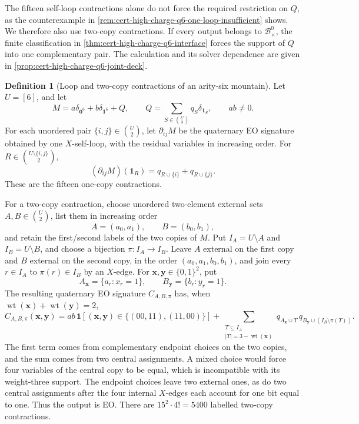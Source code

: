 \documentclass[11pt,letterpaper,onecolumn]{article}
\theoremstyle{plain}
\theoremstyle{definition}
\newtheorem{definition}[definition]{Definition}
\theoremstyle{remark}
\newcommand{\wt}{\operatorname{wt}}
\newcommand{\one}{\mathbf 1}
\newcommand{\zero}{\mathbf 0}
\begin{document}
	The fifteen self-loop contractions alone do not force the required
	restriction on \(Q\), as the counterexample in
	\cref{rem:cert-high-charge-q6-one-loop-insufficient} shows. We therefore
also use two-copy contractions. If every output belongs to
\(\mathcal B_\times^0\), the finite classification in
\cref{thm:cert-high-charge-q6-interface} forces the support of \(Q\) into
one complementary pair. The calculation and its solver dependence are
given in \cref{prop:cert-high-charge-q6-joint-deck}.
	
	\begin{definition}[Loop and two-copy contractions of an arity-six mountain]
		\label{def:hc-q6-joint-deck}
		Let \(U=[6]\), and let
		\[
		M=a\delta_{\zero^6}+b\delta_{\one^6}+Q,
		\qquad
		Q=\sum_{S\in\binom U3}q_S\delta_{\one_S},
		\qquad ab\ne0.
		\]
		For each unordered pair \(\{i,j\}\in\binom U2\), let
		\(\partial_{ij}M\) be the quaternary EO signature obtained by one
		\(X\)-self-loop, with the residual variables in increasing order.  For
		\(R\in\binom{U\setminus\{i,j\}}2\),
		\begin{equation}
			(\partial_{ij}M)(\one_R)=q_{R\cup\{i\}}+q_{R\cup\{j\}}.
			\label{eq:hc-q6-loop-deck}
		\end{equation}
		These are the fifteen one-copy contractions.
		
		For a two-copy contraction, choose unordered two-element external sets
		\(A,B\in\binom U2\), list them in increasing order
		\[
		A=(a_0,a_1),
		\qquad
		B=(b_0,b_1),
		\]
		and retain the first/second labels of the two copies of \(M\).
		Put \(I_A=U\setminus A\) and \(I_B=U\setminus B\), and choose a
		bijection \(\pi:I_A\to I_B\).  Leave \(A\) external on the first copy
		and \(B\) external on the second copy, in the order
		\((a_0,a_1,b_0,b_1)\), and join every \(r\in I_A\) to
		\(\pi(r)\in I_B\) by an \(X\)-edge.  For
		\({\mathbf x},{\mathbf y}\in\{0,1\}^2\), put
		\[
		A_{\mathbf x}=\{a_r:x_r=1\},
		\qquad
		B_{\mathbf y}=\{b_r:y_r=1\}.
		\]
		The resulting quaternary EO signature \(C_{A,B,\pi}\) has, when
		\(\wt({\mathbf x})+\wt({\mathbf y})=2\),
		\begin{equation}
			C_{A,B,\pi}({\mathbf x},{\mathbf y})
			=ab\,\one[({\mathbf x},{\mathbf y})\in\{(00,11),(11,00)\}]
			+\sum_{\substack{T\subseteq I_A\\|T|=3-\wt({\mathbf x})}}
			q_{A_{\mathbf x}\cup T}\,
			q_{B_{\mathbf y}\cup(I_B\setminus\pi(T))}.
			\label{eq:hc-q6-two-copy-deck}
		\end{equation}
		The first term comes from complementary endpoint choices on the two
		copies, and the sum comes from two central assignments. A mixed choice
		would force four variables of the central copy to be equal, which is
		incompatible with its weight-three support. The endpoint choices leave
		two external ones, as do two central assignments after the four internal
		\(X\)-edges each account for one bit equal to one. Thus the output is EO.
		There are \(15^2\cdot4!=5400\) labelled two-copy contractions.
	\end{definition}
	
\end{document}
